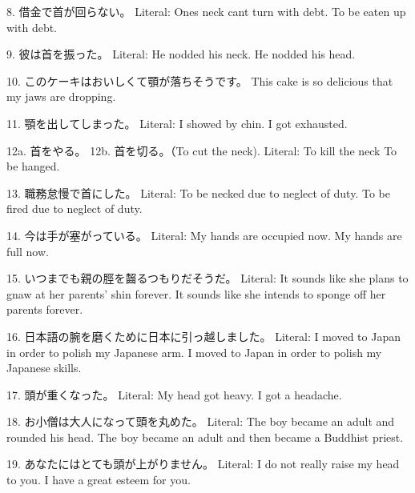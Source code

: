 \par{8. 借金で首が回らない。 \hfill\break
Literal: One\textquotesingle s neck can\textquotesingle t turn with debt. \hfill\break
To be eaten up with debt. }
 
\par{9. 彼は首を振った。 \hfill\break
Literal: He nodded his neck. \hfill\break
He nodded his head. }

\par{10. このケーキはおいしくて顎が落ちそうです。 \hfill\break
This cake is so delicious that my jaws are dropping. }

\par{11. 顎を出してしまった。 \hfill\break
Literal: I showed by chin. \hfill\break
I got exhausted. }
 
\par{12a. 首をやる。 \hfill\break
12b. 首を切る。（To cut the neck). \hfill\break
Literal: To kill the neck \hfill\break
To be hanged. }
 
\par{13. 職務怠慢で首にした。 \hfill\break
Literal: To be necked due to neglect of duty. \hfill\break
To be fired due to neglect of duty. }
 
\par{14. 今は手が塞がっている。 \hfill\break
Literal: My hands are occupied now. \hfill\break
My hands are full now. }
 
\par{15. いつまでも親の脛を齧るつもりだそうだ。 \hfill\break
Literal: It sounds like she plans to gnaw at her parents' shin forever. \hfill\break
It sounds like she intends to sponge off her parents forever. }
 
\par{16. 日本語の腕を磨くために日本に引っ越しました。 \hfill\break
Literal: I moved to Japan in order to polish my Japanese arm. \hfill\break
I moved to Japan in order to polish my Japanese skills. }
 
\par{17. 頭が重くなった。 \hfill\break
Literal: My head got heavy. \hfill\break
I got a headache. }
 
\par{18. お小僧は大人になって頭を丸めた。 \hfill\break
Literal: The boy became an adult and rounded his head. \hfill\break
The boy became an adult and then became a Buddhist priest. }
 
\par{19. あなたにはとても頭が上がりません。 \hfill\break
Literal: I do not really raise my head to you. \hfill\break
I have a great esteem for you. }
 
